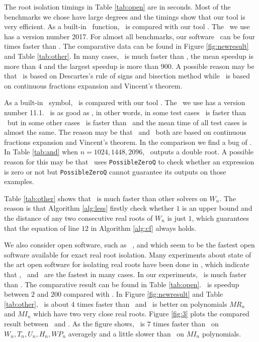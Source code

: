  The root isolation timings in Table \ref{tab:open} are in seconds.  Most of the benchmarks we chose have large degrees and the timings show that our tool is very efficient.
As a  built-in  \MAPLE\ function, \REALROOT\ is    compared with  our tool \froot.
 	The   \MAPLE\  we use has a version number 2017.  For  almost all
 benchmarks, our  software \froot\  can be  four  times faster than \REALROOT. The comparative data can be found in Figure \ref{fig:newresult} and Table \ref{tab:other}. In many cases, \froot\ is much faster than \REALROOT, the mean speedup is more than $4$ and the largest speedup is more than $900$. A possible reason may be that \REALROOT\ is based on Descartes's rule of signs and bisection method while \froot\ is based on continuous fractions expansion and Vincent's theorem.

 As a  built-in \MM\ symbol, \inte\ is    compared with  our tool \froot. The  \MM\  we use has a version number 11.1.
 	\froot\ is as good as \inte, in other words, in some test cases \froot\ is faster than \inte\ but in some other cases \inte\ is faster than \froot\ and the mean time of all test cases is  almost the same. The reason may be that \froot\ and \inte\ both are based on continuous fractions expansion and Vincent's theorem.
 	  In the comparison we find a bug of \MM. In Table \ref{tab:and} when $n=1024,1448,2096$, \inte\ outputs a double root. A possible reason for this may be that \inte\ uses {\tt PossibleZeroQ} to check whether an expression is zero or not but {\tt PossibleZeroQ} cannot guarantee its outputs on those examples.

Table \ref{tab:other} shows that \froot\ is much faster than other solvers on $W_n$. The reason is that Algorithm \ref{alg:less} firstly check whether $1$ is an upper bound and the distance of any two consecutive real roots of $W_n$ is just $1$, which guarantees that the equation of  line $12$ in Algorithm  \ref{alg:cf}  always holds.


 We also consider open software,  such as \cf\  \cite{hemmer09}, \AND\cite{Tsigaridas2016} and \SLV\cite{kobel2016computing}  which
 seem to be the fastest  open software  available for exact real root isolation. Many experiments  about  state of the art open software for isolating
 real roots have been done in \cite{hemmer09,Tsigaridas2016,kobel2016computing},  which  indicate that     \cf, \AND\ and \SLV\
 are  the fastest in many cases.
 In our experiments, \froot\ is much faster than \cf. %
 The comparative result can be found in
 Table \ref{tab:open}. \froot\ is speedup between $2$ and $200$ compared with \cf.  In Figure \ref{fig:newresult} and Table \ref{tab:other}, \froot\ is about $4$ times faster than \AND\ and \AND\ is better on polynomials $MR_n$ and $MI_n$ which have two very close real roots.  Figure \ref{fig:3} plots the  compared
 	result between \froot\ and \SLV. As the figure shows, \froot\  is $7$ times faster than  \SLV\ on $W_n,T_n,U_n,H_n,WP_n$ averagely and a little slower than \SLV\ on $MI_n$ polynomials.


